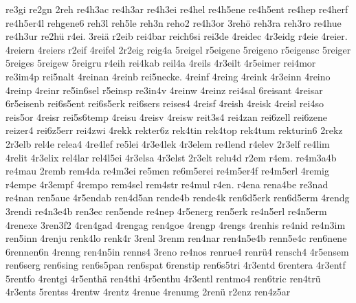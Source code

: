 {    re3gi
    re2gn
    2reh
    re4h3ac
    re4h3ar
    re4h3ei
    re4hel
    re4h5ene
    re4h5ent
    re4hep
    re4herf
    re4h5er4l
    rehgene6
    reh3l
    reh5le
    reh3n
    reho2
    re4h3or
    3rehö
    reh3ra
    reh3ro
    re4hue
    re4h3ur
    re2hü
    r4ei.
    3reiä
    r2eib
    rei4bar
    reich6si
    rei3de
    4reidec
    4r3eidg
    r4eie
    4reier.
    4reiern
    4reiers
    r2eif
    4reifel
    2r2eig
    reig4a
    5reigel
    r5eigene
    5reigeno
    r5eigensc
    5reiger
    5reiges
    5reigew
    5reigru
    r4eih
    rei4kab
    reil4a
    4reils
    4r3eilt
    4r5eimer
    rei4mor
    re3im4p
    rei5nalt
    4reinan
    4reinb
    rei5necke.
    4reinf
    4reing
    4reink
    4r3einn
    4reino
    4reinp
    4reinr
    re5in6sel
    r5einsp
    re3in4v
    4reinw
    4reinz
    rei4sal
    6reisant
    4reisar
    6r5eisenb
    rei6s5ent
    rei6s5erk
    rei6sers
    reises4
    4reisf
    4reish
    4reisk
    4reisl
    rei4so
    reis5or
    4reisr
    rei5s6temp
    4reisu
    4reisv
    4reisw
    reit3s4
    rei4zan
    rei6zell
    rei6zene
    reizer4
    rei6z5err
    rei4zwi
    4rekk
    rekter6z
    rek4tin
    rek4top
    rek4tum
    rekturin6
    2rekz
    2r3elb
    rel4e
    relea4
    4re4lef
    re5lei
    4r3e4lek
    4r3elem
    re4lend
    r4elev
    2r3elf
    re4lim
    4relit
    4r3elix
    rel4lar
    rel4l5ei
    4r3elsa
    4r3elst
    2r3elt
    relu4d
    r2em
    r4em.
    re4m3a4b
    re4mau
    2remb
    rem4da
    re4m3ei
    re5men
    re6m5erei
    re4m5er4f
    re4m5erl
    4remig
    r4empe
    4r3empf
    4rempo
    rem4sel
    rem4str
    re4mul
    r4en.
    r4ena
    rena4be
    re3nad
    re4nan
    ren5aue
    4r5endab
    ren4d5an
    rende4b
    rende4k
    ren6d5erk
    ren6d5erm
    4rendg
    3rendi
    re4n3e4b
    ren3ec
    ren5ende
    re4nep
    4r5energ
    ren5erk
    re4n5erl
    re4n5erm
    4renexe
    3ren3f2
    4ren4gad
    4rengag
    ren4goe
    4rengp
    4rengs
    4renhis
    re4nid
    re4n3im
    ren5inn
    4renju
    renk4lo
    renk4r
    3renl
    3renm
    ren4nar
    ren4n5e4b
    renn5e4c
    ren6nene
    6rennen6n
    4renng
    ren4n5in
    renns4
    3reno
    re4nos
    renrue4
    renrü4
    rensch4
    4r5ensem
    ren6serg
    ren6sing
    ren6s5pan
    ren6spat
    6renstip
    ren6s5tri
    4r3entd
    6rentera
    4r3entf
    5rentfo
    4rentgi
    4r5enthä
    ren4thi
    4r5enthu
    4r3entl
    rentmo4
    ren6tric
    ren4trü
    4r3ents
    5rentss
    4rentw
    4rentz
    4renue
    4renumg
    2renü
    r2enz
    ren4z5ar
}
